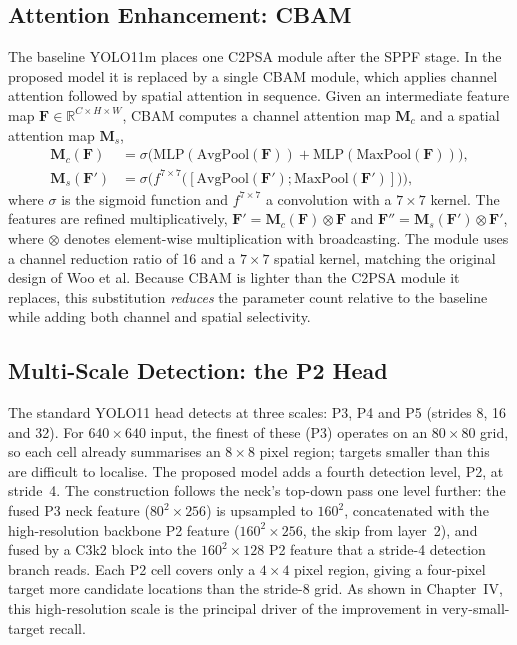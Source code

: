 \documentclass[12pt,a4paper,oneside]{report}
\begin{document}
\subsection{Attention Enhancement: CBAM}
\label{sec:cbam3}
The baseline YOLO11m places one C2PSA module after the SPPF stage. In the
proposed model it is replaced by a single CBAM module, which applies
channel attention followed by spatial attention in sequence. Given an
intermediate feature map $\mathbf{F} \in \mathbb{R}^{C \times H \times W}$, CBAM
computes a channel attention map $\mathbf{M}_c$ and a spatial attention map
$\mathbf{M}_s$,
\begin{align}
  \mathbf{M}_c(\mathbf{F}) &= \sigma\!\big(\mathrm{MLP}(\mathrm{AvgPool}(\mathbf{F}))
      + \mathrm{MLP}(\mathrm{MaxPool}(\mathbf{F}))\big), \\
  \mathbf{M}_s(\mathbf{F}') &= \sigma\!\big(f^{7\times7}\big([\mathrm{AvgPool}(\mathbf{F}');
      \mathrm{MaxPool}(\mathbf{F}')]\big)\big),
\end{align}
where $\sigma$ is the sigmoid function and $f^{7\times7}$ a convolution with a
$7\times7$ kernel. The features are refined multiplicatively,
$\mathbf{F}' = \mathbf{M}_c(\mathbf{F}) \otimes \mathbf{F}$ and
$\mathbf{F}'' = \mathbf{M}_s(\mathbf{F}') \otimes \mathbf{F}'$, where $\otimes$
denotes element-wise multiplication with broadcasting. The module uses a channel
reduction ratio of 16 and a $7\times7$ spatial kernel, matching the original
design of Woo et al. Because CBAM is lighter than the C2PSA module it
replaces, this substitution \emph{reduces} the parameter count relative
to the baseline while adding both channel and spatial selectivity.

\subsection{Multi-Scale Detection: the P2 Head}
The standard YOLO11 head detects at three scales: P3, P4 and P5 (strides 8, 16
and 32). For $640 \times 640$ input, the finest of these (P3) operates on an
$80 \times 80$ grid, so each cell already summarises an $8 \times 8$ pixel
region; targets smaller than this are difficult to localise. The proposed model
adds a fourth detection level, P2, at stride~4. The construction follows the
neck's top-down pass one level further: the fused P3 neck feature
($80^2 \times 256$) is upsampled to $160^2$, concatenated with the
high-resolution backbone P2 feature ($160^2 \times 256$, the skip from
layer~2), and fused by a C3k2 block into the $160^2 \times 128$ P2 feature that
a stride-4 detection branch reads. Each P2 cell covers only a $4 \times 4$ pixel
region, giving a four-pixel target more candidate locations than the stride-8
grid. As shown in Chapter~IV, this high-resolution scale is the principal
driver of the improvement in very-small-target recall.
\end{document}
